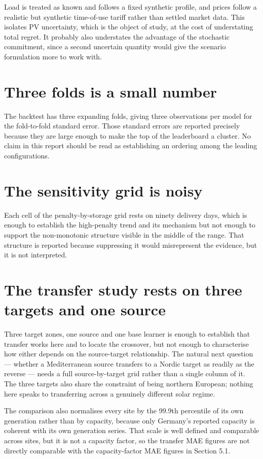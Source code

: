 \documentclass[11pt,a4paper,oneside]{report}
\begin{document}
Load is treated as known and follows a fixed synthetic profile, and prices follow a realistic but synthetic time-of-use tariff rather than settled market data. This isolates PV uncertainty, which is the object of study, at the cost of understating total regret. It probably also understates the advantage of the stochastic commitment, since a second uncertain quantity would give the scenario formulation more to work with.

\section{Three folds is a small number}

The backtest has three expanding folds, giving three observations per model for the fold-to-fold standard error. Those standard errors are reported precisely because they are large enough to make the top of the leaderboard a cluster. No claim in this report should be read as establishing an ordering among the leading configurations.

\section{The sensitivity grid is noisy}

Each cell of the penalty-by-storage grid rests on ninety delivery days, which is enough to establish the high-penalty trend and its mechanism but not enough to support the non-monotonic structure visible in the middle of the range. That structure is reported because suppressing it would misrepresent the evidence, but it is not interpreted.

\section{The transfer study rests on three targets and one source}

Three target zones, one source and one base learner is enough to establish that transfer works here and to locate the crossover, but not enough to characterise how either depends on the source-target relationship. The natural next question --- whether a Mediterranean source transfers to a Nordic target as readily as the reverse --- needs a full source-by-target grid rather than a single column of it. The three targets also share the constraint of being northern European; nothing here speaks to transferring across a genuinely different solar regime.

The comparison also normalises every site by the 99.9th percentile of its own generation rather than by capacity, because only Germany's reported capacity is coherent with its own generation series. That scale is well defined and comparable across sites, but it is not a capacity factor, so the transfer MAE figures are not directly comparable with the capacity-factor MAE figures in Section 5.1.
\end{document}

